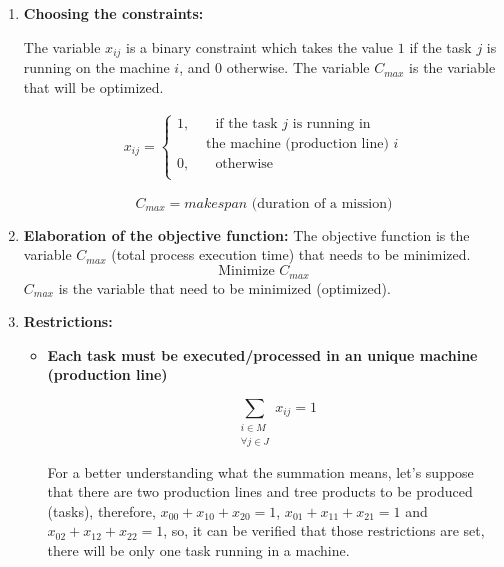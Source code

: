 \documentclass[conference,harvard,brazil,english]{sbatex}
\begin{document}
\begin{enumerate}
\item \textbf{Choosing the constraints:}

The variable $x_ {ij}$ is a binary constraint which takes the value $1$ if the task $j$ is running on the machine $i$, and $0$ otherwise. The variable $C_ {max}$ is the variable that will be optimized.

\begin{equation}
\begin{split}
x_{ij}=\begin{cases}
    1,       & \quad \text{if the task } j \text{ is running in} \\
 &\text{ the machine (production line) }i\\
    0,  & \quad \text{otherwise}\\
  \end{cases}
\end{split}
\end{equation}

\begin{equation}
C_{max}=makespan \text{ (duration of a mission)}
\end{equation}
\item \textbf{Elaboration of the objective function:}
The objective function is the variable $C_ {max}$ (total process execution time) that needs to be minimized.
\begin{equation}
\text{Minimize } C_{max}
\end{equation}
$C_{max}$ is the variable that need to be minimized (optimized).
\item \textbf{Restrictions:}

\begin{itemize}
\item \textbf{Each task must be executed/processed in an unique machine (production line)}

\begin{equation}
\sum_{\substack{
   i \in M\\
   \forall j \in J
  }} 
 x_{ij}=1
\end{equation}

For a better understanding what the summation means, let's suppose that there are two production lines and tree products to be produced (tasks), therefore, $x_{00}+x_{10}+x_{20}=1$, $x_{01}+x_{11}+x_{21}=1$ and $x_{02}+x_{12}+x_{22}=1$, so, it can be verified that those restrictions are set, there will be only one task running in a machine.


\end{itemize}
\end{enumerate}
\end{document}
